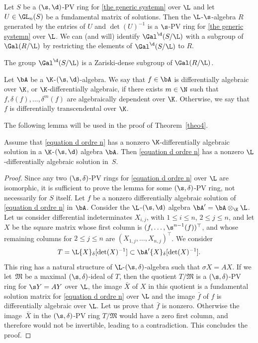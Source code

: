 Let $S$ be a $(\s,\d)$-PV ring for \eqref{the generic systemn} over $\L$ and let $U \in \GL_{n}(S)$ be a fundamental matrix of solutions.
Then the $\L$-$\s$-algebra $R$ generated by the entries of $U$ and $\det(U)^{-1}$ is a $\s$-PV ring
for \eqref{the generic systemn} over $\L$. We can (and will) identify $\Gal^{\d}(S/\L)$ with a subgroup of $\Gal(R/\L)$ by restricting the elements of $\Gal^{\d}(S/\L)$ to $R$.

\begin{prop}[{\cite[Prop.\,2.8]{HS}}]\label{propo:zarclosurePPvgaloisgroup}
The group $\Gal^{\d}(S/\L)$ is a Zariski-dense subgroup of $\Gal(R/\L)$.
\end{prop}

\begin{defi}\label{defi1}
Let $\bA$ be a $\K$-$(\s,\d)$-algebra. We say that $f\in \bA$ is differentially algebraic over $\K$, or $\K$-differentially algebraic, if there exists $m\in \N$ such that $f, \delta(f),\dots,\delta^{m}(f)$ are algebraically dependent over $\K$. Otherwise, we say that $f$ is differentially transcendental over $\K$.
\end{defi}

The following lemma will be used in the proof of Theorem~\ref{theo4}.

\begin{lem}\label{lem1}
Assume that \eqref{equation d ordre n} has a nonzero $\K$-differentially algebraic solution in a $\K$-$(\s,\d)$ algebra $\bA$. Then \eqref{equation d ordre n} has a nonzero $\L$-differentially algebraic solution in~$S$.
\end{lem}

\begin{proof}
Since any two $(\s,\delta)$-PV rings for \eqref{equation d ordre n} over $\L$ are isomorphic, it is sufficient to prove the lemma for some $(\s,\delta)$-PV ring, not necessarily for $S$ itself. Let $f$ be a nonzero differentially algebraic solution of \eqref{equation d ordre n} in $\bA$. Consider the $\L$-$(\s,\d)$ algebra $\bA'=\bA \otimes_{\K}\L$. Let us consider differential indeterminates $ X_{i,j}$, with $1\leq i\leq n$, $2\leq j\leq n$, and let $X$ be the square matrix whose first column is $(f,\dots,\s^{n-1}(f))^{\top}$, and whose remaining columns for $2\leq j \leq n$ are $(X_{1,j},\dots,X_{n,j})^{\top}$.
We consider
\[
T=\L \lbrace X\rbrace_\delta[\det(X)^{-1}] \subset \bA'\lbrace X\rbrace_\delta[\det(X)^{-1}].
\]
This ring has a natural structure of $\L$-$(\s,\delta)$-algebra such that ${\sigma X=AX}$. If we let~$\mathfrak{M}$ be a maximal $(\s,\delta)$-ideal of $T$, then the quotient $T/\mathfrak{M}$ is a $(\s,\delta)$-PV ring for $\s Y=AY$ over $\L$, the image $\bar{X}$ of $X$ in this quotient is a fundamental solution matrix for \eqref{equation d ordre n} over $\L$ and the image $\bar{f}$ of $f$ is differentially algebraic over $\L$. Let us prove that $\bar{f}$ is nonzero. Otherwise the image~$\bar{X}$ in the $(\s,\delta)$-PV ring $T/\mathfrak{M}$ would have a zero first column, and therefore would not be invertible, leading to a contradiction. This concludes the proof.
\end{proof}

